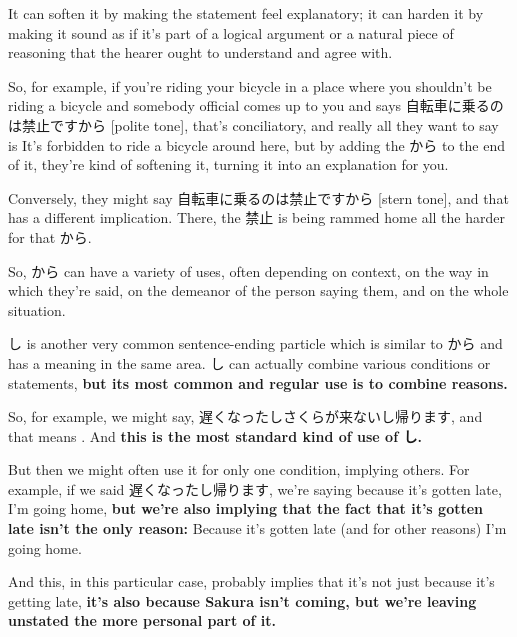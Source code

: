 {}

It can soften it by making the statement feel explanatory; it can harden it by making it sound as if it's part of a logical argument or a natural piece of reasoning that the hearer ought to understand and agree with.

So, for example, if you're riding your bicycle in a place where you shouldn't be riding a bicycle and somebody official comes up to you and says 自転車に乗るのは禁止ですから {[}polite tone{]}, that's conciliatory, and really all they want to say is It's forbidden to ride a bicycle around here, but by adding the から to the end of it, they're kind of softening it, turning it into an explanation for you.

{}

Conversely, they might say 自転車に乗るのは禁止ですから {[}stern tone{]}, and that has a different implication. There, the 禁止 is being rammed home all the harder for that から.

{}

So, から can have a variety of uses, often depending on context, on the way in which they're said, on the demeanor of the person saying them, and on the whole situation.

\stopsectionlevel

\startsectionlevel[title={し sentence-ender},reference={し-sentence-ender}]

し is another very common sentence-ending particle which is similar to から and has a meaning in the same area. し can actually combine various conditions or statements, {\bf but its most common and regular use is to combine reasons.}

So, for example, we might say, 遅くなったしさくらが来ないし帰ります, and that means . And {\bf this is the most standard kind of use of し.}

\thinrule

But then we might often use it for only one condition, implying others. For example, if we said 遅くなったし帰ります, we're saying because it's gotten late, I'm going home, {\bf but we're also implying that the fact that it's gotten late isn't the only reason:} Because it's gotten late (and for other reasons) I'm going home.

And this, in this particular case, probably implies that it's not just because it's getting late, {\bf it's also because Sakura isn't coming, but we're leaving unstated the more personal part of it.}

